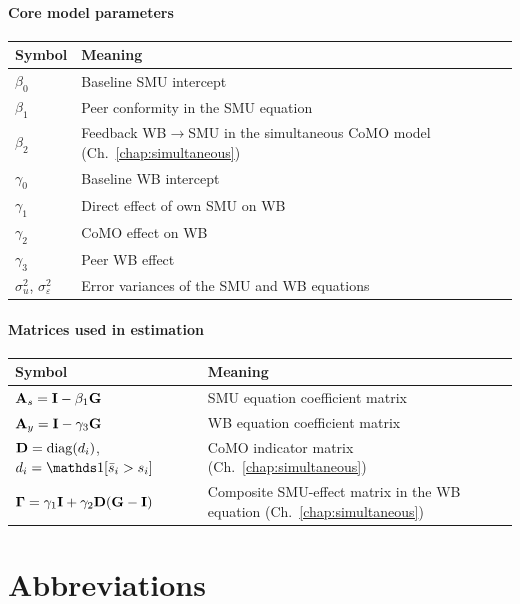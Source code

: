 \subsubsection*{Core model parameters}
\noindent\begin{tabular}{@{}l>{\raggedright\arraybackslash}p{}@{}}
\toprule
\textbf{Symbol} & \textbf{Meaning} \\
\midrule
$\beta_0$ & Baseline SMU intercept \\
$\beta_1$ & Peer conformity in the SMU equation \\
$\beta_2$ & Feedback WB$\to$SMU in the simultaneous CoMO model (Ch.~\ref{chap:simultaneous}) \\
$\gamma_0$ & Baseline WB intercept \\
$\gamma_1$ & Direct effect of own SMU on WB \\
$\gamma_2$ & CoMO effect on WB \\
$\gamma_3$ & Peer WB effect \\
$\sigma_u^2$, $\sigma_\varepsilon^2$ & Error variances of the SMU and WB equations \\
\bottomrule
\end{tabular}

\subsubsection*{Matrices used in estimation}
\noindent\begin{tabular}{@{}l>{\raggedright\arraybackslash}p{}@{}}
\toprule
\textbf{Symbol} & \textbf{Meaning} \\
\midrule
$\mathbf{A}_s = \mathbf{I} - \beta_1\mathbf{G}$ & SMU equation coefficient matrix \\
$\mathbf{A}_y = \mathbf{I} - \gamma_3\mathbf{G}$ & WB equation coefficient matrix \\
$\mathbf{D} = \operatorname{diag}(d_i)$, $d_i = \one[\sbar_i > s_i]$ & CoMO indicator matrix (Ch.~\ref{chap:simultaneous}) \\
$\mathbf{\Gamma} = \gamma_1\mathbf{I} + \gamma_2\mathbf{D}(\mathbf{G} - \mathbf{I})$ & Composite SMU-effect matrix in the WB equation (Ch.~\ref{chap:simultaneous}) \\
\bottomrule
\end{tabular}

\chapter*{Abbreviations}

